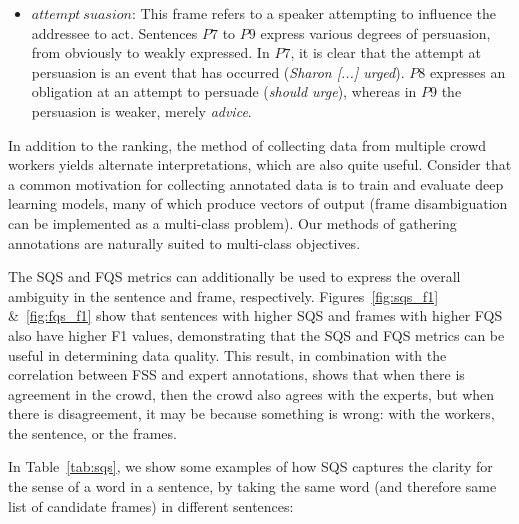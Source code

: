\begin{itemize}
\item $attempt\ suasion$: This frame refers to a speaker attempting to influence the addressee to act. Sentences $P7$ to $P9$ express various degrees of persuasion, from obviously to weakly expressed. In $P7$, it is clear that the attempt at persuasion is an event that has occurred (\textit{Sharon [...] urged}). $P8$ expresses an obligation at an attempt to persuade (\textit{should urge}), whereas in $P9$ the persuasion is weaker, merely \textit{advice}.


\end{itemize}

In addition to the ranking, the method of collecting data from multiple crowd workers yields alternate interpretations, which are also quite useful.  Consider that a common motivation for collecting annotated data is to train and evaluate deep learning models, many of which produce vectors of output (frame disambiguation can be implemented as a multi-class problem).  Our methods of gathering annotations are naturally suited to multi-class objectives.

The SQS and FQS metrics can additionally be used to express the overall ambiguity in the sentence and frame, respectively. Figures~\ref{fig:sqs_f1} \&~\ref{fig:fqs_f1} show that sentences with higher SQS and frames with higher FQS also have higher F1 values, demonstrating that the SQS and FQS metrics can be useful in determining data quality. This result, in combination with the correlation between FSS and expert annotations, shows that when there is agreement in the crowd, then the crowd also agrees with the experts, but when there is disagreement, it may be because something is wrong: with the workers, the sentence, or the frames.

In Table~\ref{tab:sqs}, we show some examples of how SQS captures the clarity for the sense of a word in a sentence, by taking the same word (and therefore same list of candidate frames) in different sentences:



